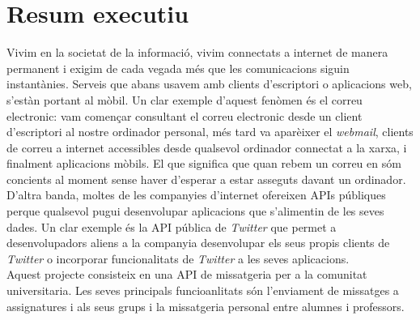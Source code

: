 
\chapter{Resum executiu}

Vivim en la societat de la informació, vivim connectats a internet de manera permanent i exigim de cada vegada més que les comunicacions siguin instantànies. Serveis que abans usavem amb clients d'escriptori o aplicacions web, s'estàn portant al mòbil. Un clar exemple d'aquest fenòmen és el correu electronic: vam començar consultant el correu electronic desde un client d'escriptori al nostre ordinador personal, més tard va aparèixer el \emph{webmail}, clients de correu a internet accessibles desde qualsevol ordinador connectat a la xarxa, i finalment aplicacions mòbils. El que significa que quan rebem un correu en sóm concients al moment sense haver d'esperar a estar asseguts davant un ordinador.\\

D'altra banda, moltes de les companyies d'internet ofereixen APIs públiques perque qualsevol pugui desenvolupar aplicacions que s'alimentin de les seves dades. Un clar exemple és la API pública de \emph{Twitter} que permet a desenvolupadors aliens a la companyia desenvolupar els seus propis clients de \emph{Twitter }o incorporar funcionalitats de \emph{Twitter} a les seves aplicacions. \\

Aquest projecte consisteix en una API de missatgeria per a la comunitat universitaria. Les seves principals funcioanlitats són l'enviament de missatges a assignatures i als seus grups i la missatgeria personal entre alumnes i professors.